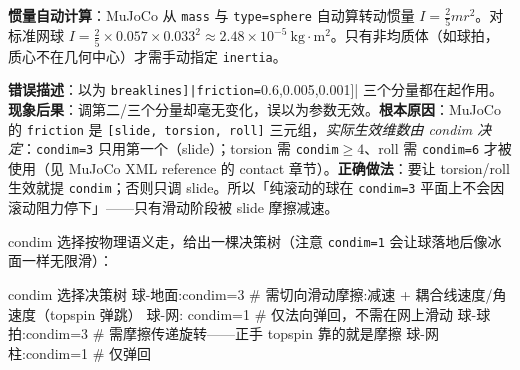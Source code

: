 \textbf{惯量自动计算}：MuJoCo 从 \verb|mass| 与 \verb|type=sphere| 自动算转动惯量 $I=\tfrac{2}{5}mr^2$。对标准网球 $I=\tfrac{2}{5}\times0.057\times0.033^2\approx2.48\times10^{-5}\ \mathrm{kg\cdot m^2}$。只有非均质体（如球拍，质心不在几何中心）才需手动指定 \verb|inertia|。

\begin{pitfall}
\textbf{错误描述}：以为 \Verb[breaklines]|friction=[0.6,0.005,0.001]| 三个分量都在起作用。\textbf{现象后果}：调第二/三个分量却毫无变化，误以为参数无效。\textbf{根本原因}：MuJoCo 的 \texttt{friction} 是 \texttt{[slide, torsion, roll]} 三元组，\emph{实际生效维数由 condim 决定}：\texttt{condim=3} 只用第一个（slide）；torsion 需 \texttt{condim}$\ge4$、roll 需 \texttt{condim=6} 才被使用（见 MuJoCo XML reference 的 contact 章节）。\textbf{正确做法}：要让 torsion/roll 生效就提 \verb|condim|；否则只调 slide。所以「纯滚动的球在 \verb|condim=3| 平面上不会因滚动阻力停下」——只有滑动阶段被 slide 摩擦减速。
\end{pitfall}

condim 选择按物理语义走，给出一棵决策树（注意 \verb|condim=1| 会让球落地后像冰面一样无限滑）：

\begin{codebox}[text]{condim 选择决策树}
球-地面:condim=3   # 需切向滑动摩擦:减速 + 耦合线速度/角速度（topspin 弹跳）
球-网:  condim=1   # 仅法向弹回，不需在网上滑动
球-球拍:condim=3   # 需摩擦传递旋转——正手 topspin 靠的就是摩擦
球-网柱:condim=1   # 仅弹回
\end{codebox}

